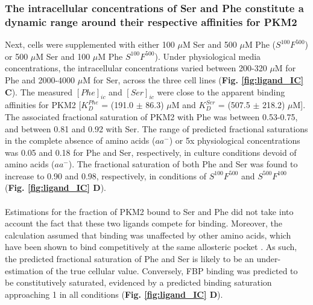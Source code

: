 \subsubsection{The intracellular concentrations of Ser and Phe constitute a dynamic range around their respective affinities for PKM2}
Next, cells were supplemented with either 100 $\mu$M Ser and 500 $\mu$M Phe ($S^{100}F^{500}$) or 500 $\mu$M Ser and 100 $\mu$M Phe $S^{100}F^{500}$). Under physiological media concentrations, the intracellular concentrations varied between 200-320 $\mu$M for Phe and 2000-4000 $\mu$M for Ser, across the three cell lines (\textbf{Fig. \ref{fig:ligand_IC} C}). The measured $[Phe]_{ic}$ and $[Ser]_{ic}$ were close to the apparent binding affinities for PKM2 [$K_{D}^{Phe}$ = (191.0 $\pm$ 86.3) $\mu$M and $K_{D}^{Ser}$ = (507.5 $\pm$ 218.2) $\mu$M]. The associated fractional saturation of PKM2 with Phe was between 0.53-0.75, and between 0.81 and 0.92 with Ser. The range of predicted fractional saturations in the complete absence of amino acids ($aa^{-}$) or 5x physiological concentrations was 0.05 and 0.18 for Phe and Ser, respectively, in culture conditions devoid of amino acids ($aa^{-}$). The fractional saturation of both Phe and Ser was found to increase to 0.90 and 0.98, respectively, in conditions of $S^{100}F^{500}$ and $S^{500}F^{100}$ (\textbf{Fig. \ref{fig:ligand_IC} D}). 
%
%
\\\\
%
%
Estimations for the fraction of PKM2 bound to Ser and Phe did not take into account the fact that these two ligands compete for binding. Moreover, the calculation assumed that binding was unaffected by other amino acids, which have been shown to bind competitively at the same allosteric pocket \cite{Yuan:2018aa}. As such, the predicted fractional saturation of Phe and Ser is likely to be an under-estimation of the true cellular value. Conversely, FBP binding was predicted to be constitutively saturated, evidenced by a predicted binding saturation approaching 1 in all conditions (\textbf{Fig. \ref{fig:ligand_IC} D}).
%
%
%
%
